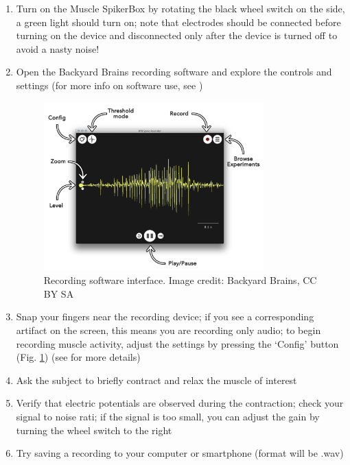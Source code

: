 \documentclass[12pt]{article}
\begin{document}
\begin{enumerate}
\item Turn on the Muscle SpikerBox by rotating the black wheel switch on the side, a green light should turn on; note that electrodes should be connected before turning on the device and disconnected only after the device is turned off to avoid a nasty noise!
\item Open the Backyard Brains recording software and explore the controls and settings (for more info on software use, see \cite{spikeRecorder})

\begin{figure}[h!]
\centering
\includegraphics[width=0.8\textwidth]{figures/BBrecorder.png}
\caption{Recording software interface. Image credit: Backyard Brains, CC BY SA}
\label{fig:recorder}
\end{figure}

\item Snap your fingers near the recording device; if you see a corresponding artifact on the screen, this means you are recording only audio; to begin recording muscle activity, adjust the settings by pressing the `Config' button (Fig. \ref{fig:recorder}) (see \cite{spikeRecorder} for more details)
\item Ask the subject to briefly contract and relax the muscle of interest 
\item Verify that electric potentials are observed during the contraction; check your signal to noise rati; if the signal is too small, you can adjust the gain by turning the wheel switch to the right
\item Try saving a recording to your computer or smartphone (format will be .wav)
\end{enumerate}
\end{document}
